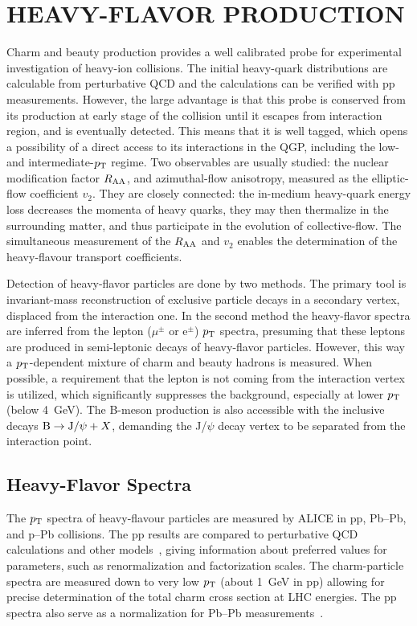 \section{HEAVY-FLAVOR PRODUCTION}
\label{heavyflavor}
Charm and beauty production provides a well calibrated probe for experimental investigation of heavy-ion collisions. The initial heavy-quark distributions are calculable from perturbative QCD and the calculations can be verified with pp measurements. However, the large advantage is that this probe is conserved from its production at early stage of the collision until it escapes from interaction region, and is eventually detected. This means that it is well tagged, which opens a possibility of a direct access to its interactions in the QGP, including the low- and intermediate-$p_{\rm T}$ regime. Two observables are usually studied: the nuclear modification factor $R_{\rm AA}$, and azimuthal-flow anisotropy, measured as the elliptic-flow coefficient $v_2$. They are closely connected: the in-medium heavy-quark energy loss decreases the momenta of heavy quarks, they may then thermalize in the surrounding matter, and thus participate in the evolution of collective-flow. The simultaneous measurement of the $R_{\rm AA}$ and $v_2$ enables the determination of the heavy-flavour transport coefficients.

Detection of heavy-flavor particles are done by two methods. The primary tool is invariant-mass reconstruction of exclusive particle decays in a secondary vertex, displaced from the interaction one. In the second method the heavy-flavor spectra are inferred from the lepton ($\mu^\pm$ or e$^\pm$) $p_{\rm T}$ spectra, presuming that these leptons are produced in semi-leptonic decays of heavy-flavor particles. However, this way a $p_{\rm T}$-dependent mixture of charm and beauty hadrons is measured. When possible, a requirement that the lepton is not coming from the interaction vertex is utilized, which significantly suppresses the background, especially at lower $p_{\rm T}$ (below 4~GeV). The B-meson production is also accessible with the inclusive decays ${\rm B} \rightarrow {\rm J}/\psi + X$, demanding the J/$\psi$ decay vertex to be separated from the interaction point.

\subsection{Heavy-Flavor Spectra}
\label{subsecks:heavyspectra}
The $p_{\rm T}$ spectra of heavy-flavour particles are measured by ALICE in pp, Pb--Pb, and p--Pb collisions. The pp results are compared to perturbative QCD calculations and other models~\cite{ALICE:2011aa,Abelev:2012vra}, giving information about preferred values for parameters, such as renormalization and factorization scales. The charm-particle spectra are measured down to very low $p_{\rm T}$ (about 1~GeV in pp) allowing for precise determination of the total charm cross section at LHC energies. The pp spectra also serve as a normalization for Pb--Pb measurements~\cite{ALICE:2012ab}.


